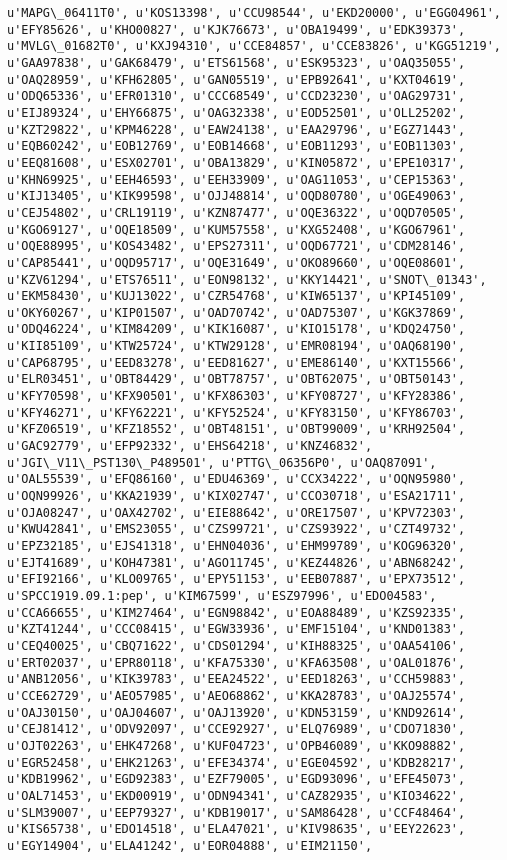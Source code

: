 \documentclass[11pt]{article}
\begin{document}
\begin{Verbatim}[commandchars=\\\{\}]
u'MAPG\_06411T0', u'KOS13398', u'CCU98544', u'EKD20000', u'EGG04961', u'EFY85626', u'KHO00827', u'KJK76673', u'OBA19499', u'EDK39373', u'MVLG\_01682T0', u'KXJ94310', u'CCE84857', u'CCE83826', u'KGG51219', u'GAA97838', u'GAK68479', u'ETS61568', u'ESK95323', u'OAQ35055', u'OAQ28959', u'KFH62805', u'GAN05519', u'EPB92641', u'KXT04619', u'ODQ65336', u'EFR01310', u'CCC68549', u'CCD23230', u'OAG29731', u'EIJ89324', u'EHY66875', u'OAG32338', u'EOD52501', u'OLL25202', u'KZT29822', u'KPM46228', u'EAW24138', u'EAA29796', u'EGZ71443', u'EQB60242', u'EOB12769', u'EOB14668', u'EOB11293', u'EOB11303', u'EEQ81608', u'ESX02701', u'OBA13829', u'KIN05872', u'EPE10317', u'KHN69925', u'EEH46593', u'EEH33909', u'OAG11053', u'CEP15363', u'KIJ13405', u'KIK99598', u'OJJ48814', u'OQD80780', u'OGE49063', u'CEJ54802', u'CRL19119', u'KZN87477', u'OQE36322', u'OQD70505', u'KGO69127', u'OQE18509', u'KUM57558', u'KXG52408', u'KGO67961', u'OQE88995', u'KOS43482', u'EPS27311', u'OQD67721', u'CDM28146', u'CAP85441', u'OQD95717', u'OQE31649', u'OKO89660', u'OQE08601', u'KZV61294', u'ETS76511', u'EON98132', u'KKY14421', u'SNOT\_01343', u'EKM58430', u'KUJ13022', u'CZR54768', u'KIW65137', u'KPI45109', u'OKY60267', u'KIP01507', u'OAD70742', u'OAD75307', u'KGK37869', u'ODQ46224', u'KIM84209', u'KIK16087', u'KIO15178', u'KDQ24750', u'KII85109', u'KTW25724', u'KTW29128', u'EMR08194', u'OAQ68190', u'CAP68795', u'EED83278', u'EED81627', u'EME86140', u'KXT15566', u'ELR03451', u'OBT84429', u'OBT78757', u'OBT62075', u'OBT50143', u'KFY70598', u'KFX90501', u'KFX86303', u'KFY08727', u'KFY28386', u'KFY46271', u'KFY62221', u'KFY52524', u'KFY83150', u'KFY86703', u'KFZ06519', u'KFZ18552', u'OBT48151', u'OBT99009', u'KRH92504', u'GAC92779', u'EFP92332', u'EHS64218', u'KNZ46832', u'JGI\_V11\_PST130\_P489501', u'PTTG\_06356P0', u'OAQ87091', u'OAL55539', u'EFQ86160', u'EDU46369', u'CCX34222', u'OQN95980', u'OQN99926', u'KKA21939', u'KIX02747', u'CCO30718', u'ESA21711', u'OJA08247', u'OAX42702', u'EIE88642', u'ORE17507', u'KPV72303', u'KWU42841', u'EMS23055', u'CZS99721', u'CZS93922', u'CZT49732', u'EPZ32185', u'EJS41318', u'EHN04036', u'EHM99789', u'KOG96320', u'EJT41689', u'KOH47381', u'AGO11745', u'KEZ44826', u'ABN68242', u'EFI92166', u'KLO09765', u'EPY51153', u'EEB07887', u'EPX73512', u'SPCC1919.09.1:pep', u'KIM67599', u'ESZ97996', u'EDO04583', u'CCA66655', u'KIM27464', u'EGN98842', u'EOA88489', u'KZS92335', u'KZT41244', u'CCC08415', u'EGW33936', u'EMF15104', u'KND01383', u'CEQ40025', u'CBQ71622', u'CDS01294', u'KIH88325', u'OAA54106', u'ERT02037', u'EPR80118', u'KFA75330', u'KFA63508', u'OAL01876', u'ANB12056', u'KIK39783', u'EEA24522', u'EED18263', u'CCH59883', u'CCE62729', u'AEO57985', u'AEO68862', u'KKA28783', u'OAJ25574', u'OAJ30150', u'OAJ04607', u'OAJ13920', u'KDN53159', u'KND92614', u'CEJ81412', u'ODV92097', u'CCE92927', u'ELQ76989', u'CDO71830', u'OJT02263', u'EHK47268', u'KUF04723', u'OPB46089', u'KKO98882', u'EGR52458', u'EHK21263', u'EFE34374', u'EGE04592', u'KDB28217', u'KDB19962', u'EGD92383', u'EZF79005', u'EGD93096', u'EFE45073', u'OAL71453', u'EKD00919', u'ODN94341', u'CAZ82935', u'KIO34622', u'SLM39007', u'EEP79327', u'KDB19017', u'SAM86428', u'CCF48464', u'KIS65738', u'EDO14518', u'ELA47021', u'KIV98635', u'EEY22623', u'EGY14904', u'ELA41242', u'EOR04888', u'EIM21150', 
\end{Verbatim}
\end{document}

